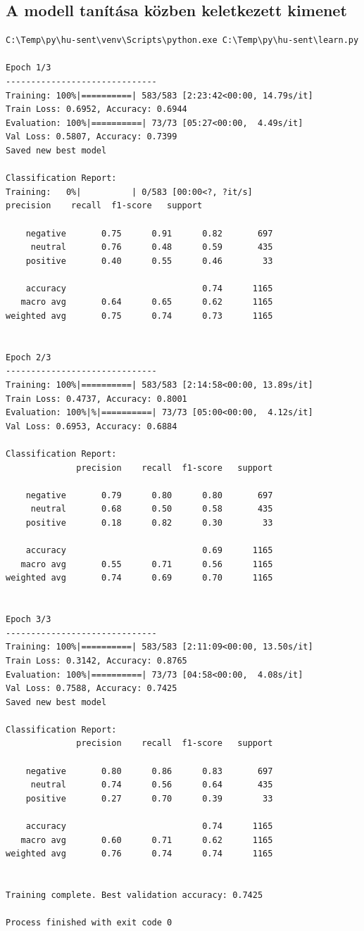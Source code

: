 \documentclass[12pt]{article}
\begin{document}
\subsection{A modell tanítása közben keletkezett kimenet}

\begin{lstlisting}[style=docker]
C:\Temp\py\hu-sent\venv\Scripts\python.exe C:\Temp\py\hu-sent\learn.py

Epoch 1/3
------------------------------
Training: 100%|==========| 583/583 [2:23:42<00:00, 14.79s/it]
Train Loss: 0.6952, Accuracy: 0.6944
Evaluation: 100%|==========| 73/73 [05:27<00:00,  4.49s/it]
Val Loss: 0.5807, Accuracy: 0.7399
Saved new best model

Classification Report:
Training:   0%|          | 0/583 [00:00<?, ?it/s]              precision    recall  f1-score   support

    negative       0.75      0.91      0.82       697
     neutral       0.76      0.48      0.59       435
    positive       0.40      0.55      0.46        33

    accuracy                           0.74      1165
   macro avg       0.64      0.65      0.62      1165
weighted avg       0.75      0.74      0.73      1165


Epoch 2/3
------------------------------
Training: 100%|==========| 583/583 [2:14:58<00:00, 13.89s/it]
Train Loss: 0.4737, Accuracy: 0.8001
Evaluation: 100%|%|==========| 73/73 [05:00<00:00,  4.12s/it]
Val Loss: 0.6953, Accuracy: 0.6884

Classification Report:
              precision    recall  f1-score   support

    negative       0.79      0.80      0.80       697
     neutral       0.68      0.50      0.58       435
    positive       0.18      0.82      0.30        33

    accuracy                           0.69      1165
   macro avg       0.55      0.71      0.56      1165
weighted avg       0.74      0.69      0.70      1165


Epoch 3/3
------------------------------
Training: 100%|==========| 583/583 [2:11:09<00:00, 13.50s/it]
Train Loss: 0.3142, Accuracy: 0.8765
Evaluation: 100%|==========| 73/73 [04:58<00:00,  4.08s/it]
Val Loss: 0.7588, Accuracy: 0.7425
Saved new best model

Classification Report:
              precision    recall  f1-score   support

    negative       0.80      0.86      0.83       697
     neutral       0.74      0.56      0.64       435
    positive       0.27      0.70      0.39        33

    accuracy                           0.74      1165
   macro avg       0.60      0.71      0.62      1165
weighted avg       0.76      0.74      0.74      1165


Training complete. Best validation accuracy: 0.7425

Process finished with exit code 0
\end{lstlisting}
\end{document}

